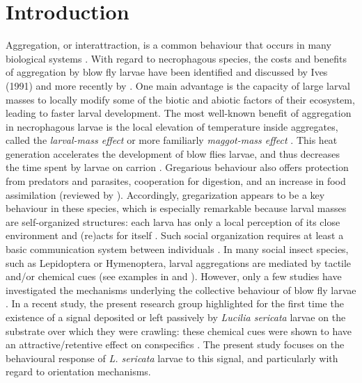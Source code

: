 	\section{Introduction}
Aggregation, or interattraction, is a common behaviour that occurs in many biological systems \cite{krause_living_2002}. With regard to necrophagous species, the costs and benefits of aggregation by blow fly larvae have been identified and discussed by Ives (1991) and more recently by \citet{rivers_physiological_2011}. One main advantage is the capacity of large larval masses to locally modify some of the biotic and abiotic factors of their ecosystem, leading to faster larval development. The most well-known benefit of aggregation in necrophagous larvae  is the local elevation of temperature inside aggregates, called the \textit{larval-mass effect} or more familiarly \textit{maggot-mass effect} \citep{slone_thermoregulation_2007, huckesfeld_feel_2011, rivers_physiological_2011, charabidze_larval-mass_2011}. This heat generation accelerates the development of blow flies larvae, and thus decreases the time spent by larvae on carrion \citep{heaton_quantifying_2014, johnson_effect_2014}. Gregarious behaviour also offers protection from predators and parasites, cooperation for digestion, and an increase in food assimilation (reviewed by \citet{rivers_physiological_2011}). Accordingly, gregarization appears to be a key behaviour in these species, which is especially remarkable because larval masses are self-organized structures: each larva has only a local perception of its close environment and (re)acts for itself \cite{camazine_self-organization_2001}.     
Such social organization requires at least a basic communication system between individuals \cite{camazine_self-organization_2001}. In many social insect species, such as Lepidoptera or Hymenoptera, larval aggregations are mediated by tactile and/or chemical cues (see examples in \citet{wertheim_pheromone-mediated_2005} and \citet{costa_other_2006}). However, only a few studies have investigated the mechanisms underlying the collective behaviour of blow fly larvae \citep{rivers_physiological_2011, boulay_evidence_2013}. In a recent study, the present research group \cite{boulay_evidence_2013} highlighted for the first time the existence of a signal  deposited or left passively by \textit{Lucilia sericata} larvae on the substrate over which they were crawling: these chemical cues were shown to have an attractive/retentive effect on conspecifics \cite{boulay_evidence_2013}. The present study focuses on the behavioural response of \textit{L. sericata} larvae to this signal, and particularly with regard to orientation mechanisms.


